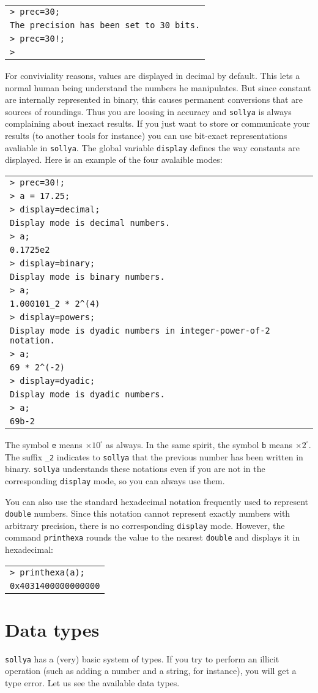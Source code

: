 \documentclass[a4paper]{article}
\newcommand{\com}[1]{\texttt{#1}}
\newcommand{\key}[1]{\texttt{#1}}
\newcommand{\sollya}{\texttt{sollya}\xspace}
\newcommand{\code}[1]{\begin{center}
\begin{tabular}{|p{14.8cm}|}
\hline
#1
\hline
\end{tabular}
\end{center}
}
\newcommand{\ligne}[1]{\texttt{#1}\\}
\begin{document}
\code{
\ligne{> prec=30;}
\ligne{The precision has been set to 30 bits.}
\ligne{> prec=30!;}
\ligne{>}
}

For conviviality reasons, values are displayed in decimal by default. This lets a normal human being understand the numbers he manipulates. But since constant are internally represented in binary, this causes permanent conversions that are sources of roundings. Thus you are loosing in accuracy and \sollya is always complaining about inexact results. If you just want to store or communicate your results (to another tools for instance) you can use bit-exact representations avaliable in \sollya. The global variable \key{display} defines the way constants are displayed. Here is an example of the four avalaible modes:


\code{
\ligne{> prec=30!;}
\ligne{> a = 17.25;}
\ligne{> display=decimal;}
\ligne{Display mode is decimal numbers.}
\ligne{> a;}
\ligne{0.1725e2}
\ligne{> display=binary;}
\ligne{Display mode is binary numbers.}
\ligne{> a;}
\ligne{1.000101\_2 * 2\^{}(4)}
\ligne{> display=powers;}
\ligne{Display mode is dyadic numbers in integer-power-of-2 notation.}
\ligne{> a;}
\ligne{69 * 2\^{}(-2)}
\ligne{> display=dyadic;}
\ligne{Display mode is dyadic numbers.}
\ligne{> a;}
\ligne{69b-2}
}

The symbol \texttt{e} means $\times 10^\square $ as always. In the same spirit, the symbol \texttt{b} means  $\times 2^\square $. The suffix \texttt{\_2} indicates to \sollya that the previous number has been written in binary. \sollya understands these notations even if you are not in the corresponding \key{display} mode, so you can always use them.

You can also use the standard hexadecimal notation frequently used to represent \texttt{double} numbers. Since this notation cannot represent exactly numbers with arbitrary precision, there is no corresponding \key{display} mode. However, the command \com{printhexa} rounds the value to the nearest \texttt{double} and displays it in hexadecimal:

\code{
\ligne{> printhexa(a);}
\ligne{0x4031400000000000}
}

\section{Data types}
\sollya has a (very) basic system of types. If you try to perform an illicit operation (such as adding a number and a string, for instance), you will get a type error. Let us see the available data types.
\end{document}
